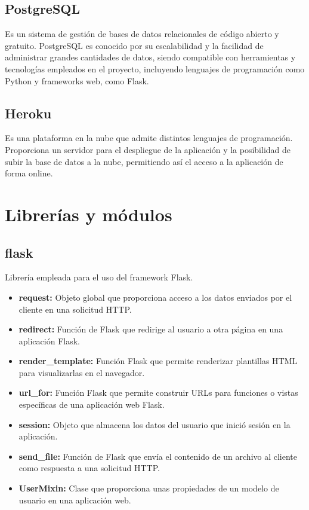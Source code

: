 \subsection{PostgreSQL} 
\cite{PostgreSQL_bib} Es un sistema de gestión de bases de datos relacionales de código abierto y gratuito.
PostgreSQL es conocido por su escalabilidad y la facilidad de administrar grandes cantidades de datos, siendo compatible con herramientas y tecnologías empleados en el proyecto, incluyendo lenguajes de programación como Python y frameworks web, como Flask.

\subsection{Heroku} 
\cite{heroku_bib} Es una plataforma en la nube que admite distintos lenguajes de programación. Proporciona un servidor para el despliegue de la aplicación y la posibilidad de subir la base de datos a la nube, permitiendo así el acceso a la aplicación de forma online.

\section{Librerías y módulos}
\subsection{flask}
Librería empleada para el uso del framework Flask.
\begin{itemize}
    \item \textbf{request:} \cite{request} Objeto global que proporciona acceso a los datos enviados por el cliente en una solicitud HTTP.
    \item \textbf{redirect:} \cite{redirect} Función de Flask que redirige al usuario a otra página en una aplicación Flask.
    \item \textbf{render\_template:}
\cite{render_template} Función Flask que permite renderizar plantillas HTML para visualizarlas en el navegador.
    \item \textbf{url\_for:} \cite{url} Función Flask que permite construir URLs para funciones o vistas específicas de una aplicación web Flask.
    \item \textbf{session:} \cite{session} Objeto que almacena los datos del usuario que inició sesión en la aplicación.
    \item \textbf{send\_file:} \cite{send_file} Función de Flask que envía el contenido de un archivo al cliente como respuesta a una solicitud HTTP.
    \item \textbf{UserMixin:} \cite{UserMixin} Clase que proporciona unas propiedades de un modelo de usuario en una aplicación web.
\end{itemize}

